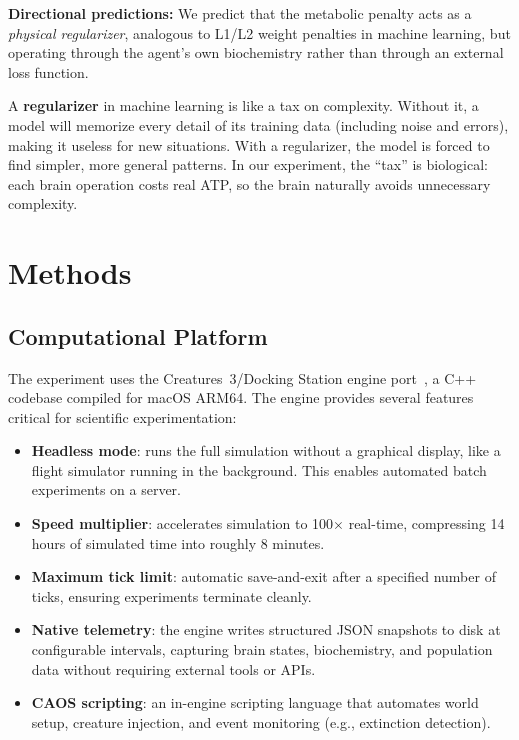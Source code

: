 \documentclass[12pt, a4paper]{article}
\begin{document}
\noindent\textbf{Directional predictions:} We predict that the metabolic penalty acts as a \emph{physical regularizer}, analogous to L1/L2 weight penalties in machine learning, but operating through the agent's own biochemistry rather than through an external loss function.

\begin{plainbox}
A \textbf{regularizer} in machine learning is like a tax on complexity. Without it, a model will memorize every detail of its training data (including noise and errors), making it useless for new situations. With a regularizer, the model is forced to find simpler, more general patterns. In our experiment, the ``tax'' is biological: each brain operation costs real ATP, so the brain naturally avoids unnecessary complexity.
\end{plainbox}

\section{Methods}
\label{sec:methods}

\subsection{Computational Platform}

The experiment uses the Creatures~3/Docking Station engine port~\cite{sadovsky2025creatures3}, a C++ codebase compiled for macOS ARM64. The engine provides several features critical for scientific experimentation:
\begin{itemize}[nosep]
  \item \textbf{Headless mode}: runs the full simulation without a graphical display, like a flight simulator running in the background. This enables automated batch experiments on a server.
  \item \textbf{Speed multiplier}: accelerates simulation to 100$\times$ real-time, compressing 14 hours of simulated time into roughly 8 minutes.
  \item \textbf{Maximum tick limit}: automatic save-and-exit after a specified number of ticks, ensuring experiments terminate cleanly.
  \item \textbf{Native telemetry}: the engine writes structured JSON snapshots to disk at configurable intervals, capturing brain states, biochemistry, and population data without requiring external tools or APIs.
  \item \textbf{CAOS scripting}: an in-engine scripting language that automates world setup, creature injection, and event monitoring (e.g., extinction detection).
\end{itemize}
\end{document}
